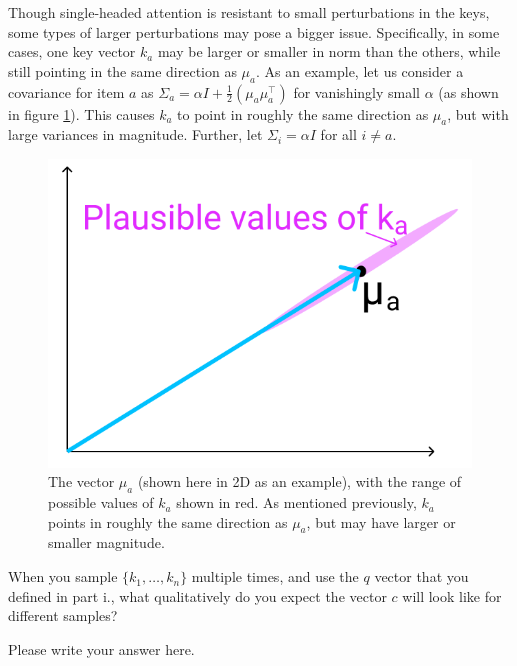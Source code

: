 \begin{parts}
\begin{subparts}
        \subpart[3] Though single-headed attention is resistant to small perturbations in the keys, some types of larger perturbations may pose a bigger issue. Specifically, in some cases, one key vector $k_a$ may be larger or smaller in norm than the others, while still pointing in the same direction as $\mu_a$. As an example, let us consider a covariance for item $a$ as $\Sigma_a = \alpha I + \frac{1}{2}(\mu_a\mu_a^\top)$ for vanishingly small $\alpha$ (as shown in figure \ref{ka_plausible}). This causes $k_a$ to point in roughly the same direction as $\mu_a$, but with large variances in magnitude. Further, let $\Sigma_i = \alpha I$ for all $i \neq a$.
        \begin{figure}[h]
            \centering
            \captionsetup{justification=centering,margin=2cm}
            \includegraphics[width=0.35\linewidth]{images/ka_plausible.png}
            \caption{The vector $\mu_a$ (shown here in 2D as an example), with the range of possible values of $k_a$ shown in red. As mentioned previously, $k_a$ points in roughly the same direction as $\mu_a$, but may have larger or smaller magnitude.}
            \label{ka_plausible}
        \end{figure}

        When you sample $\{k_1,\dots,k_n\}$ multiple times, and use the $q$ vector that you defined in part i., what qualitatively do you expect the vector $c$ will look like for different samples?

        \begin{answer}
            Please write your answer here.
        \end{answer}
    \end{subparts}


\end{parts}
